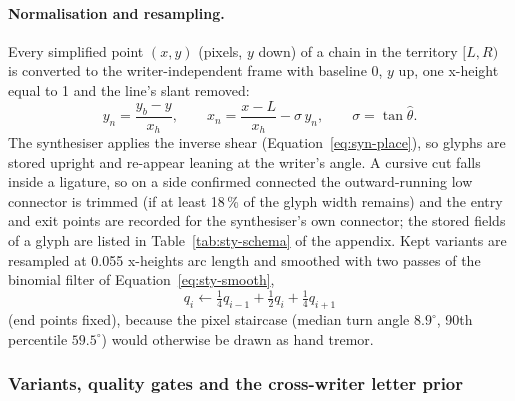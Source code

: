 \paragraph{Normalisation and resampling.}
Every simplified point $(x,y)$ (pixels, $y$ down) of a chain in the territory $[L,R)$ is converted to the writer-independent frame with baseline 0, $y$ up, one x-height equal to 1 and the line's slant removed:
\begin{equation}
y_n=\frac{y_b-y}{x_h},\qquad x_n=\frac{x-L}{x_h}-\sigma\,y_n,\qquad\sigma=\tan\hat\theta .
\label{eq:sty-norm}
\end{equation}
The synthesiser applies the inverse shear (Equation~\ref{eq:syn-place}), so glyphs are stored upright and re-appear leaning at the writer's angle.
A cursive cut falls inside a ligature, so on a side confirmed connected the outward-running low connector is trimmed (if at least 18\,\% of the glyph width remains) and the entry and exit points are recorded for the synthesiser's own connector; the stored fields of a glyph are listed in Table~\ref{tab:sty-schema} of the appendix.
Kept variants are resampled at 0.055 x-heights arc length and smoothed with two passes of the binomial filter of Equation~\ref{eq:sty-smooth},
\begin{equation}
q_i\leftarrow\tfrac14q_{i-1}+\tfrac12q_i+\tfrac14q_{i+1}
\label{eq:sty-smooth}
\end{equation}
(end points fixed), because the pixel staircase (median turn angle $8.9^\circ$, 90th percentile $59.5^\circ$) would otherwise be drawn as hand tremor.

\subsubsection{Variants, quality gates and the cross-writer letter prior}

